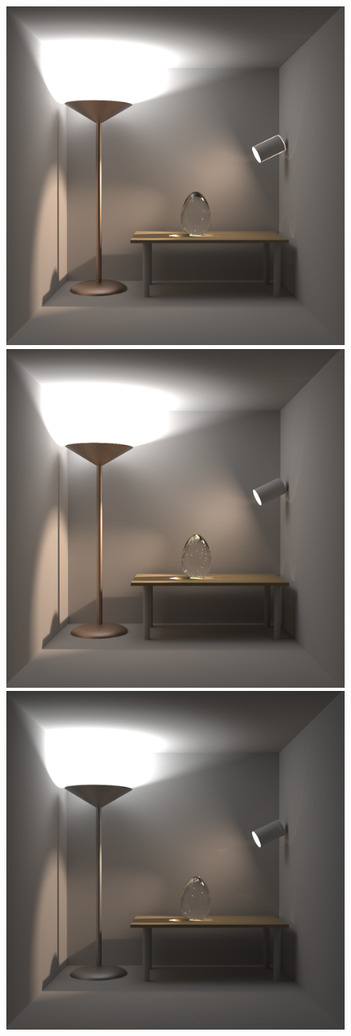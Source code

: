 \begin{figure}
\centering
\includegraphics[width=0.32\linewidth]{images/5_results/veach-bidir/1_from_mitsuba.png}
\includegraphics[width=0.32\linewidth]{images/5_results/veach-bidir/2_to_pbrt.png}
\includegraphics[width=0.32\linewidth]{images/5_results/veach-bidir/3_to_lux.png}
\end{figure}
